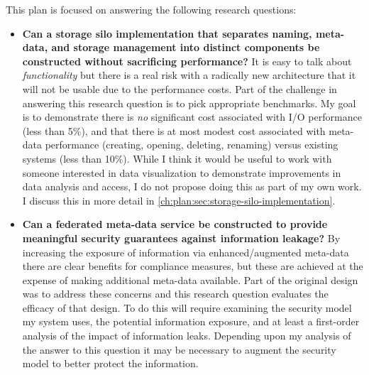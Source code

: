 
This plan is focused on answering the following research questions:

\begin{itemize}
    \item \textbf{Can a storage silo implementation that separates naming, meta-data,
              and storage management into distinct components be constructed without
              sacrificing performance?}\label{ch:plan:rq:naming-separation-performance}  It is easy to talk about \emph{functionality} but
          there is a real risk with a radically new architecture that it will
          not be usable due to the performance costs. Part of the challenge in
          answering this research question is to pick appropriate benchmarks.  My goal
          is to demonstrate there is \emph{no} significant cost associated with I/O
          performance (less than 5\%), and that there is at most modest cost
          associated with meta-data performance (creating, opening, deleting,
          renaming) versus existing systems (less than 10\%).  While I think it would
          be useful to work with someone interested in data visualization to
          demonstrate improvements in data analysis and access, I do not propose doing
          this as part of my own work.  I discuss this in more detail in
          \autoref{ch:plan:sec:storage-silo-implementation}.

    \item \textbf{Can a federated meta-data service be constructed to provide meaningful
              security guarantees against information leakage?}
          \label{ch:plan:rq:security} By increasing the exposure
          of information via enhanced/augmented meta-data there are clear benefits for
          compliance measures, but these are achieved at the expense of making
          additional meta-data available.  Part of the original design was to address
          these concerns and this research question evaluates the efficacy of that
          design.  To do this will require examining the security model my system
          uses, the potential information exposure, and at least a first-order
          analysis of the impact of information leaks.  Depending upon my analysis of
          the answer to this question it may be necessary to augment the \system
          security model to better protect the information.


\end{itemize}
